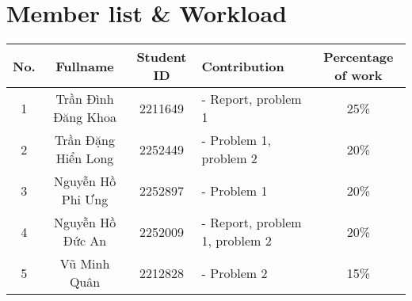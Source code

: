 \newpage

\section{Member list \& Workload}

\begin{center}
\begin{tabular}{|c|c|c|l|c|}
\hline
\textbf{No.} & \textbf{Fullname} & \textbf{Student ID} & \textbf{Contribution} & \textbf{Percentage of work}\\
\hline 
\multirow{1}{*}{1} & \multirow{1}{*}{Trần Đình Đăng Khoa} & \multirow{1}{*}{2211649} & - Report, problem 1& \multirow{1}{*}{25\%}\\
\hline 
\multirow{1}{*}{2} & \multirow{1}{*}{Trần Đặng Hiển Long} & \multirow{1}{*}{2252449} & - Problem 1, problem 2& \multirow{1}{*}{20\%}\\
\hline
\multirow{1}{*}{3} & \multirow{1}{*}{Nguyễn Hồ Phi Ưng} & \multirow{1}{*}{2252897} & - Problem 1& \multirow{1}{*}{20\%}\\
\hline
\multirow{1}{*}{4} & \multirow{1}{*}{Nguyễn Hồ Đức An} & \multirow{1}{*}{2252009} & - Report, problem 1, problem 2& \multirow{1}{*}{20\%}\\
\hline
\multirow{1}{*}{5} & \multirow{1}{*}{Vũ Minh Quân} & \multirow{1}{*}{2212828} & - Problem 2 & \multirow{1}{*}{15\%}\\
\hline
\end{tabular}
\end{center}